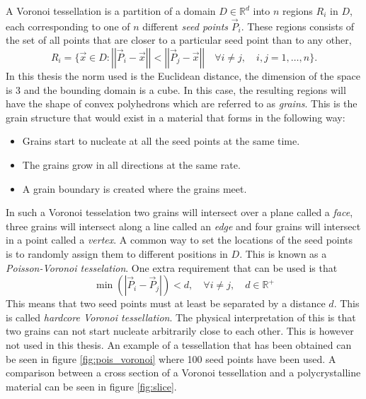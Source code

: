 \documentclass[micro_gen.tex]{subfiles}
\begin{document}
A Voronoi tessellation is a partition of a domain $D \in \mathbb{R}^d$ into $n$ regions $R_i$ in $D$, each corresponding to one of $n$ different \textit{seed points} $\vec{P}_i$. 
These regions consists of the set of all points that are closer to a particular seed point than to any other,
%
\[R_i = \{ \vec{x} \in D : \left|\left| \vec{P}_i - \vec{x} \right|\right| < \left|\left| \vec{P}_j - \vec{x} \right|\right| \quad  \forall i \neq j, \quad i,j = 1, \ldots, n \}. \]
%
In this thesis the norm used is the Euclidean distance, the dimension of the space is 3 and the bounding domain is a cube.
In this case, the resulting regions will have the shape of convex polyhedrons which are referred to as \textit{grains}. 
This is the grain structure that would exist in a material that forms in the following way:
\begin{itemize}
\item Grains start to nucleate at all the seed points at the same time.
\item The grains grow in all directions at the same rate.
\item A grain boundary is created where the grains meet.
\end{itemize}
In such a Voronoi tesselation two grains will intersect over a plane called a \textit{face},
three grains will intersect along a line called an \textit{edge} and four grains will intersect in a point called a \textit{vertex}. A common way to set the locations of the seed points is to randomly assign them to different positions in $D$. This is known as a \textit{Poisson-Voronoi tesselation}. One extra requirement that can be used is that 
%
\[ \min \left( |\vec{P}_i - \vec{P}_j| \right) < d, \quad \forall i \neq j, \quad d \in \mathbb{R}^+ \]
%
This means that two seed points must at least be separated by a distance $d$. This is called \textit{hardcore Voronoi tessellation}. The physical interpretation of this is that two grains can not start nucleate arbitrarily close to each other. This is however not used in this thesis. An example of a tessellation that has been obtained can be seen in figure \ref{fig:pois_voronoi} where 100 seed points have been used. A comparison between a cross section of a Voronoi tessellation and a polycrystalline material can be seen in figure \ref{fig:slice}.
\end{document}
